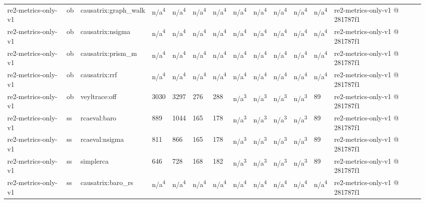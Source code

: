 \begin{table}[t]
\begin{tabular}{lllllllllllll}
re2-metrics-only-v1 & ob & causatrix:graph\_walk & n/a\textsuperscript{4} & n/a\textsuperscript{4} & n/a\textsuperscript{4} & n/a\textsuperscript{4} & n/a\textsuperscript{4} & n/a\textsuperscript{4} & n/a\textsuperscript{4} & n/a\textsuperscript{4} & n/a\textsuperscript{4} & re2-metrics-only-v1 @ 281787f1 \\
re2-metrics-only-v1 & ob & causatrix:nsigma & n/a\textsuperscript{4} & n/a\textsuperscript{4} & n/a\textsuperscript{4} & n/a\textsuperscript{4} & n/a\textsuperscript{4} & n/a\textsuperscript{4} & n/a\textsuperscript{4} & n/a\textsuperscript{4} & n/a\textsuperscript{4} & re2-metrics-only-v1 @ 281787f1 \\
re2-metrics-only-v1 & ob & causatrix:prism\_m & n/a\textsuperscript{4} & n/a\textsuperscript{4} & n/a\textsuperscript{4} & n/a\textsuperscript{4} & n/a\textsuperscript{4} & n/a\textsuperscript{4} & n/a\textsuperscript{4} & n/a\textsuperscript{4} & n/a\textsuperscript{4} & re2-metrics-only-v1 @ 281787f1 \\
re2-metrics-only-v1 & ob & causatrix:rrf & n/a\textsuperscript{4} & n/a\textsuperscript{4} & n/a\textsuperscript{4} & n/a\textsuperscript{4} & n/a\textsuperscript{4} & n/a\textsuperscript{4} & n/a\textsuperscript{4} & n/a\textsuperscript{4} & n/a\textsuperscript{4} & re2-metrics-only-v1 @ 281787f1 \\
re2-metrics-only-v1 & ob & veyltrace:off & 3030 & 3297 & 276 & 288 & n/a\textsuperscript{3} & n/a\textsuperscript{3} & n/a\textsuperscript{3} & n/a\textsuperscript{3} & 89 & re2-metrics-only-v1 @ 281787f1 \\
re2-metrics-only-v1 & ss & rcaeval:baro & 889 & 1044 & 165 & 178 & n/a\textsuperscript{3} & n/a\textsuperscript{3} & n/a\textsuperscript{3} & n/a\textsuperscript{3} & 89 & re2-metrics-only-v1 @ 281787f1 \\
re2-metrics-only-v1 & ss & rcaeval:nsigma & 811 & 866 & 165 & 178 & n/a\textsuperscript{3} & n/a\textsuperscript{3} & n/a\textsuperscript{3} & n/a\textsuperscript{3} & 89 & re2-metrics-only-v1 @ 281787f1 \\
re2-metrics-only-v1 & ss & simplerca & 646 & 728 & 168 & 182 & n/a\textsuperscript{3} & n/a\textsuperscript{3} & n/a\textsuperscript{3} & n/a\textsuperscript{3} & 89 & re2-metrics-only-v1 @ 281787f1 \\
re2-metrics-only-v1 & ss & causatrix:baro\_rs & n/a\textsuperscript{4} & n/a\textsuperscript{4} & n/a\textsuperscript{4} & n/a\textsuperscript{4} & n/a\textsuperscript{4} & n/a\textsuperscript{4} & n/a\textsuperscript{4} & n/a\textsuperscript{4} & n/a\textsuperscript{4} & re2-metrics-only-v1 @ 281787f1 \\

\end{tabular}
\end{table}
